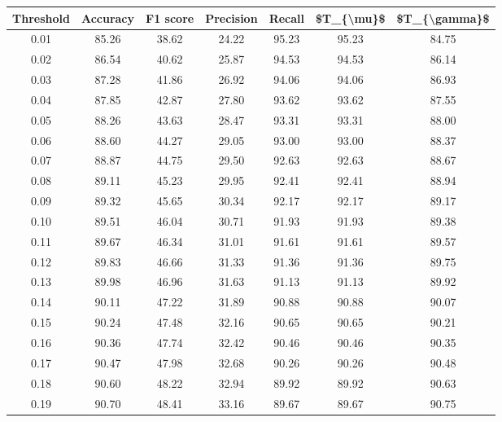 \begin{tabular}{|c|c|c|c|c|c|c|}
\hline
 Threshold &  Accuracy &  F1 score &  Precision &  Recall &  \$T\_\{\textbackslash mu\}\$ &  \$T\_\{\textbackslash gamma\}\$ \\
\hline
      0.01 &     85.26 &     38.62 &      24.22 &   95.23 &      95.23 &         84.75 \\
      0.02 &     86.54 &     40.62 &      25.87 &   94.53 &      94.53 &         86.14 \\
      0.03 &     87.28 &     41.86 &      26.92 &   94.06 &      94.06 &         86.93 \\
      0.04 &     87.85 &     42.87 &      27.80 &   93.62 &      93.62 &         87.55 \\
      0.05 &     88.26 &     43.63 &      28.47 &   93.31 &      93.31 &         88.00 \\
      0.06 &     88.60 &     44.27 &      29.05 &   93.00 &      93.00 &         88.37 \\
      0.07 &     88.87 &     44.75 &      29.50 &   92.63 &      92.63 &         88.67 \\
      0.08 &     89.11 &     45.23 &      29.95 &   92.41 &      92.41 &         88.94 \\
      0.09 &     89.32 &     45.65 &      30.34 &   92.17 &      92.17 &         89.17 \\
      0.10 &     89.51 &     46.04 &      30.71 &   91.93 &      91.93 &         89.38 \\
      0.11 &     89.67 &     46.34 &      31.01 &   91.61 &      91.61 &         89.57 \\
      0.12 &     89.83 &     46.66 &      31.33 &   91.36 &      91.36 &         89.75 \\
      0.13 &     89.98 &     46.96 &      31.63 &   91.13 &      91.13 &         89.92 \\
      0.14 &     90.11 &     47.22 &      31.89 &   90.88 &      90.88 &         90.07 \\
      0.15 &     90.24 &     47.48 &      32.16 &   90.65 &      90.65 &         90.21 \\
      0.16 &     90.36 &     47.74 &      32.42 &   90.46 &      90.46 &         90.35 \\
      0.17 &     90.47 &     47.98 &      32.68 &   90.26 &      90.26 &         90.48 \\
      0.18 &     90.60 &     48.22 &      32.94 &   89.92 &      89.92 &         90.63 \\
      0.19 &     90.70 &     48.41 &      33.16 &   89.67 &      89.67 &         90.75 \\

\end{tabular}
